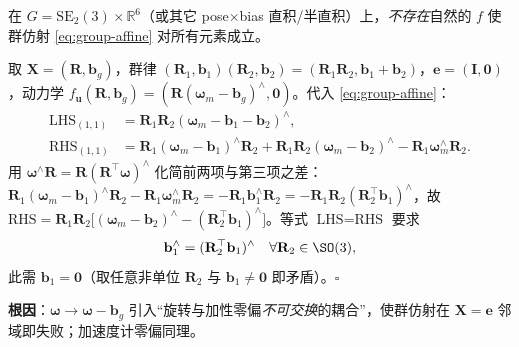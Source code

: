 \begin{theorem}\label{thm:bias-negative}
在 $G=\mathrm{SE}_2(3)\times\mathbb{R}^6$（或其它 pose$\times$bias 直积/半直积）上，\emph{不存在}自然的 $f$ 使群仿射 \cref{eq:group-affine} 对所有元素成立。
\end{theorem}

\begin{derivation}
\label{deriv:bias-negative}
取 $\mathbf{X}=(\mathbf{R},\mathbf{b}_g)$，群律 $(\mathbf{R}_1,\mathbf{b}_1)(\mathbf{R}_2,\mathbf{b}_2)=(\mathbf{R}_1\mathbf{R}_2,\mathbf{b}_1+\mathbf{b}_2)$，$\mathbf{e}=(\mathbf{I},\mathbf{0})$，动力学 $f_{\mathbf{u}}(\mathbf{R},\mathbf{b}_g)=(\mathbf{R}(\boldsymbol{\omega}_m-\mathbf{b}_g)^\wedge,\mathbf{0})$。代入 \cref{eq:group-affine}：
\begin{align*}
  \text{LHS}_{(1,1)}&=\mathbf{R}_1\mathbf{R}_2(\boldsymbol{\omega}_m-\mathbf{b}_1-\mathbf{b}_2)^\wedge,\\
  \text{RHS}_{(1,1)}&=\mathbf{R}_1(\boldsymbol{\omega}_m-\mathbf{b}_1)^\wedge\mathbf{R}_2+\mathbf{R}_1\mathbf{R}_2(\boldsymbol{\omega}_m-\mathbf{b}_2)^\wedge-\mathbf{R}_1\boldsymbol{\omega}_m^\wedge\mathbf{R}_2.
\end{align*}
用 $\boldsymbol{\omega}^\wedge\mathbf{R}=\mathbf{R}(\mathbf{R}^\top\boldsymbol{\omega})^\wedge$ 化简前两项与第三项之差：$\mathbf{R}_1(\boldsymbol{\omega}_m-\mathbf{b}_1)^\wedge\mathbf{R}_2-\mathbf{R}_1\boldsymbol{\omega}_m^\wedge\mathbf{R}_2=-\mathbf{R}_1\mathbf{b}_1^\wedge\mathbf{R}_2=-\mathbf{R}_1\mathbf{R}_2(\mathbf{R}_2^\top\mathbf{b}_1)^\wedge$，故 $\text{RHS}=\mathbf{R}_1\mathbf{R}_2\big[(\boldsymbol{\omega}_m-\mathbf{b}_2)^\wedge-(\mathbf{R}_2^\top\mathbf{b}_1)^\wedge\big]$。等式 $\text{LHS}=\text{RHS}$ 要求
\begin{equation}
  \mathbf{b}_1^\wedge=(\mathbf{R}_2^\top\mathbf{b}_1)^\wedge\quad\forall\mathbf{R}_2\in\SO(3),
  \label{eq:bias-contradiction}
\end{equation}
此需 $\mathbf{b}_1=\mathbf{0}$（取任意非单位 $\mathbf{R}_2$ 与 $\mathbf{b}_1\neq\mathbf{0}$ 即矛盾）。$\square$
\end{derivation}

\noindent{}\textbf{根因}：$\boldsymbol{\omega}\to\boldsymbol{\omega}-\mathbf{b}_g$ 引入“旋转与加性零偏\emph{不可交换}的耦合”，使群仿射在 $\mathbf{X}=\mathbf{e}$ 邻域即失败；加速度计零偏同理。

